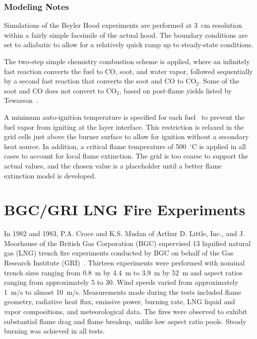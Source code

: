 \subsubsection{Modeling Notes}

Simulations of the Beyler Hood experiments are performed at 3~cm resolution within a fairly simple facsimile of the actual hood. The boundary conditions are set to adiabatic to allow for a relatively quick ramp up to steady-state conditions.

The two-step simple chemistry combustion scheme is applied, where an infinitely fast reaction converts the fuel to CO, soot, and water vapor, followed sequentially by a second fast reaction that converts the soot and CO to CO$_2$. Some of the soot and CO does not convert to CO$_2$, based on post-flame yields listed by Tewarson~\cite{SFPE:Tewarson}.

A minimum auto-ignition temperature is specified for each fuel~\cite{SFPE:Beyler} to prevent the fuel vapor from igniting at the layer interface. This restriction is relaxed in the grid cells just above the burner surface to allow for ignition without a secondary heat source. In addition, a critical flame temperature of 500~$^\circ$C is applied in all cases to account for local flame extinction. The grid is too coarse to support the actual values, and the chosen value is a placeholder until a better flame extinction model is developed.

\section{BGC/GRI LNG Fire Experiments}
\label{BGC_GRI_LNG_Fires_Description}

In 1982 and 1983, P.A. Croce and K.S. Mudan of Arthur D. Little, Inc., and J. Moorhouse of the British Gas Corporation (BGC) supervised 13 liquified natural gas (LNG) trench fire experiments conducted by BGC on behalf of the Gas Research Institute (GRI)~\cite{Croce:GRI}. Thirteen experiments were performed with nominal trench sizes ranging from 0.8~m by 4.4~m to 3.9~m by 52~m and aspect ratios ranging from approximately 5 to 30. Wind speeds varied from approximately 1~m/s to almost 10~m/s. Measurements made during the tests included flame geometry, radiative heat flux, emissive power, burning rate, LNG liquid and vapor compositions, and meteorological data. The fires were observed to exhibit substantial flame drag and flame breakup, unlike low aspect ratio pools. Steady burning was achieved in all tests.

